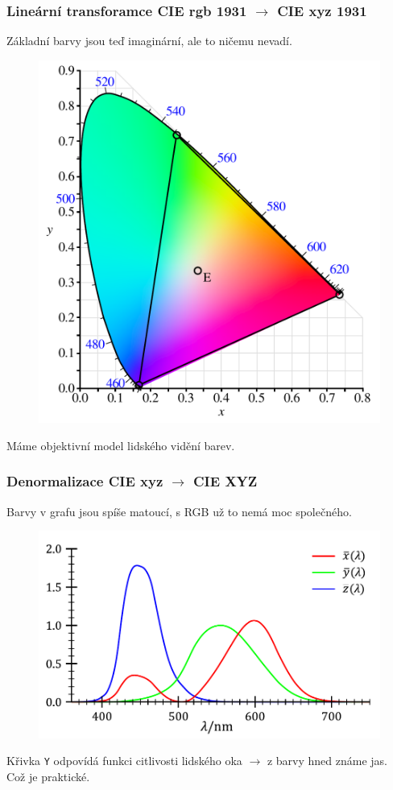 \documentclass{beamer}
\begin{document}
\begin{frame}
  \center
  \frametitle{Lineární transforamce CIE rgb 1931 $\rightarrow$ CIE xyz 1931}
  Základní barvy jsou teď imaginární, ale to ničemu nevadí.
  \begin{figure}
    \includegraphics[height=0.6\textheight]{CIE1931xy_CIERGB.pdf}
  \end{figure}
  Máme objektivní model lidského vidění barev.
\end{frame}

\begin{frame}
  \center
  \frametitle{Denormalizace CIE xyz $\rightarrow$ CIE XYZ}
  Barvy v grafu jsou spíše matoucí, s RGB už to nemá moc společného.
  \begin{figure}
    \includegraphics[height=0.6\textheight]{CIE_1931_XYZ_Color_Matching_Functions.pdf}
  \end{figure}
  Křivka \texttt{Y} odpovídá funkci citlivosti lidského oka $\rightarrow$ z barvy hned známe jas.\\
  Což je praktické.
\end{frame}
\end{document}
